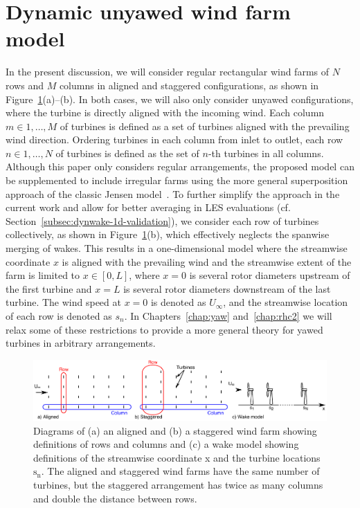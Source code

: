 \section{Dynamic unyawed wind farm model}
\label{sec:dynwake-1d}
In the present discussion, we will consider regular rectangular wind farms of $N$ rows and $M$ columns in aligned and staggered configurations, as shown in Figure~\ref{fig:wake_model}(a)--(b). In both cases, we will also only consider unyawed configurations, where the turbine is directly aligned with the incoming wind. Each column $m \in 1, \hdots, M$ of turbines is defined as a set of turbines aligned with the prevailing wind direction. Ordering turbines in each column from inlet to outlet, each row $n \in 1, \hdots, N$ of turbines is defined as the set of $n$-th turbines in all columns. Although this paper only considers regular arrangements, the proposed model can be supplemented to include irregular farms using the more general superposition approach of the classic Jensen model~\cite{Katic1986a}. To further simplify the approach in the current work and allow for better averaging in LES evaluations (cf. Section~\ref{subsec:dynwake-1d-validation}), we consider each row of turbines collectively, as shown in Figure~\ref{fig:wake_model}(b), which effectively neglects the spanwise merging of wakes. This results in a one-dimensional model where the streamwise coordinate $x$ is aligned with the prevailing wind and the streamwise extent of the farm is limited to $x \in [0, L]$, where $x=0$ is several rotor diameters upstream of the first turbine and $x=L$ is several rotor diameters downstream of the last turbine. The wind speed at $x=0$ is denoted as $U_\infty$, and the streamwise location of each row is denoted as $s_n$. In Chapters~\ref{chap:yaw} and~\ref{chap:rhc2} we will relax some of these restrictions to provide a more general theory for yawed turbines in arbitrary arrangements. 

\begin{figure}
\centering
\includegraphics[width=\textwidth]{./fig/wake_model_final.pdf}
\caption{Diagrams of (a) an aligned and (b) a staggered wind farm showing definitions of rows and columns and (c) a wake model showing definitions of the streamwise coordinate x and the turbine locations $\text{s}_\text{n}$. The aligned and staggered wind farms have the same number of turbines, but the staggered arrangement has twice as many columns and double the distance between rows.}
\label{fig:wake_model}
\end{figure}

